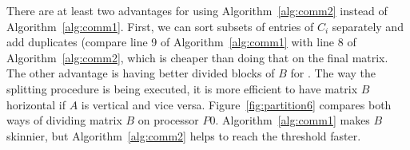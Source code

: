 There are at least two advantages for using Algorithm~\ref{alg:comm2} instead of Algorithm~\ref{alg:comm1}. First, we can sort subsets of entries of $C_i$ separately and add duplicates (compare line 9 of Algorithm~\ref{alg:comm1} with line $8$ of Algorithm~\ref{alg:comm2}, which is cheaper than doing that on the final matrix. The other advantage is having better divided blocks of $B$ for \recmm. The way the splitting procedure is being executed, it is more efficient to have matrix $B$ horizontal if $A$ is vertical and vice versa. Figure~\ref{fig:partition6} compares both ways of dividing matrix $B$ on processor $P0$. Algorithm~\ref{alg:comm1} makes $B$ skinnier, but Algorithm~\ref{alg:comm2} helps to reach the threshold faster.

